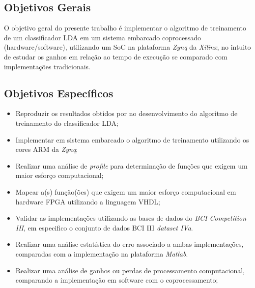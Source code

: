 \subsection{Objetivos Gerais}

	O objetivo geral do presente trabalho é implementar o algoritmo de treinamento de um classificador LDA em um sistema embarcado coprocessado (hardware/software), utilizando um SoC na plataforma \textit{Zynq} da \textit{Xilinx}, no intuito de estudar os ganhos em relação ao tempo de execução se comparado com implementações tradicionais.

\subsection{Objetivos Específicos}

\begin{itemize}
	\item Reproduzir os resultados obtidos por \cite{F.Lotte} no desenvolvimento do algoritmo de treinamento do classificador LDA;

	\item Implementar em sistema embarcado o algoritmo de treinamento utilizando os cores ARM da \textit{Zynq};
	
	\item Realizar uma análise de \textit{profile} para determinação de funções que exigem um maior esforço computacional;
	
	\item Mapear a(s) função(ões) que exigem um maior esforço computacional em hardware FPGA utilizando a linguagem VHDL;
	

	\item Validar as implementações utilizando as bases de dados do \textit{BCI Competition III}, em especifico o conjunto de dados BCI III \textit{dataset IVa}.
	
	\item Realizar uma análise estatística do erro associado a ambas implementações, comparadas com a implementação na plataforma \textit{Matlab}.
	
	\item Realizar uma análise de ganhos ou perdas de processamento computacional, comparando a implementação em software com o coprocessamento;
\end{itemize}
